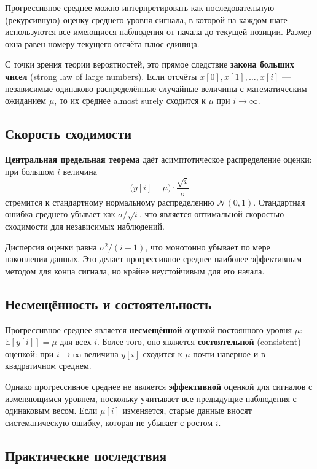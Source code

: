 \documentclass[12pt,a4paper]{article}
\begin{document}
Прогрессивное среднее можно интерпретировать как последовательную (рекурсивную) оценку среднего уровня сигнала, в которой на каждом шаге используются все имеющиеся наблюдения от начала до текущей позиции. Размер окна равен номеру текущего отсчёта плюс единица.

С точки зрения теории вероятностей, это прямое следствие \textbf{закона больших чисел} (strong law of large numbers). Если отсчёты $x[0], x[1], \ldots, x[i]$ --- независимые одинаково распределённые случайные величины с математическим ожиданием $\mu$, то их среднее almost surely сходится к $\mu$ при $i \to \infty$.

\subsection{Скорость сходимости}

\textbf{Центральная предельная теорема} даёт асимптотическое распределение оценки: при большом $i$ величина
\[
\bigl(y[i] - \mu\bigr) \cdot \frac{\sqrt{i}}{\sigma}
\]
стремится к стандартному нормальному распределению $\mathcal{N}(0,1)$. Стандартная ошибка среднего убывает как $\sigma / \sqrt{i}$, что является оптимальной скоростью сходимости для независимых наблюдений.

Дисперсия оценки равна $\sigma^2 / (i+1)$, что монотонно убывает по мере накопления данных. Это делает прогрессивное среднее наиболее эффективным методом для конца сигнала, но крайне неустойчивым для его начала.

\subsection{Несмещённость и состоятельность}

Прогрессивное среднее является \textbf{несмещённой} оценкой постоянного уровня $\mu$: $\mathbb{E}[y[i]] = \mu$ для всех $i$. Более того, оно является \textbf{состоятельной} (consistent) оценкой: при $i \to \infty$ величина $y[i]$ сходится к $\mu$ почти наверное и в квадратичном среднем.

Однако прогрессивное среднее не является \textbf{эффективной} оценкой для сигналов с изменяющимся уровнем, поскольку учитывает все предыдущие наблюдения с одинаковым весом. Если $\mu[i]$ изменяется, старые данные вносят систематическую ошибку, которая не убывает с ростом $i$.

\subsection{Практические последствия}
\end{document}
